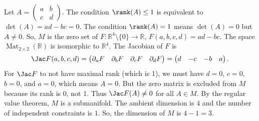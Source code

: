 \begin{exercisesolution}
Let $A = \begin{pmatrix} a & b \\ c & d \end{pmatrix}$. The condition $\rank(A) \leq 1$ is equivalent to $\det(A) = ad - bc = 0$.
The condition $\rank(A) = 1$ means $\det(A) = 0$ but $A \neq 0$.
So, $M$ is the zero set of $F : \mathbb{R}^4 \setminus \{0\} \to \mathbb{R}$, $F(a,b,c,d) = ad - bc$.
The space $\operatorname{Mat}_{2\times 2}(\mathbb{R})$ is isomorphic to $\mathbb{R}^4$.
The Jacobian of $F$ is
\[ \Jac F(a,b,c,d) = \begin{pmatrix} \partial_a F & \partial_b F & \partial_c F & \partial_d F \end{pmatrix} = \begin{pmatrix} d & -c & -b & a \end{pmatrix}. \]
For $\Jac F$ to not have maximal rank (which is 1), we must have $d = 0$, $c = 0$, $b = 0$, and $a = 0$, which means $A = 0$.
But the zero matrix is excluded from $M$ because its rank is 0, not 1.
Thus $\Jac F(A) \neq 0$ for all $A \in M$. By the regular value theorem, $M$ is a submanifold.
The ambient dimension is $4$ and the number of independent constraints is $1$.
So, the dimension of $M$ is $4 - 1 = 3$.
\end{exercisesolution}

